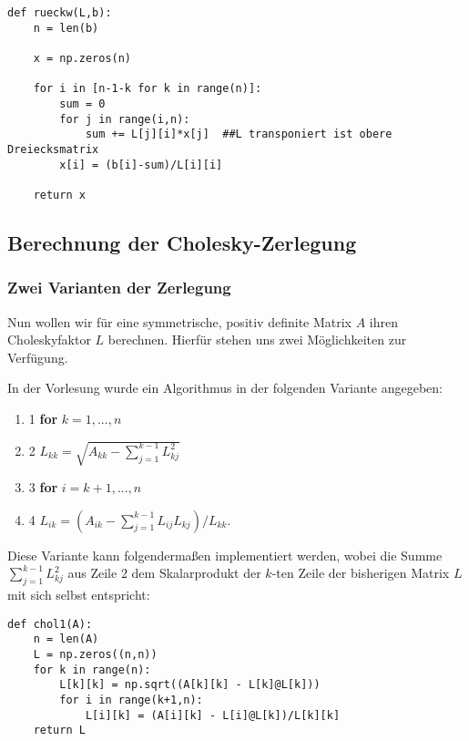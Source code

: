 \lstset{language=Python}
\lstset{frame=lines}
\lstset{basicstyle=\footnotesize}
\begin{lstlisting}
def rueckw(L,b):
    n = len(b)

    x = np.zeros(n)

    for i in [n-1-k for k in range(n)]:
        sum = 0
        for j in range(i,n):
            sum += L[j][i]*x[j]  ##L transponiert ist obere Dreiecksmatrix
        x[i] = (b[i]-sum)/L[i][i]

    return x
\end{lstlisting}

\subsection{Berechnung der Cholesky-Zerlegung}
\subsubsection{Zwei Varianten der Zerlegung}

Nun wollen wir für eine symmetrische, positiv definite Matrix $A$ ihren Choleskyfaktor $L$ berechnen. Hierfür stehen uns zwei Möglichkeiten zur Verfügung.

In der Vorlesung wurde ein Algorithmus in der folgenden Variante angegeben:
\begin{enumerate}
\itemsep0em
\item[] 1 \textbf{for} $k = 1,...,n$
\item[] 2 \qquad $L_{kk} = \sqrt{A_{kk} - \sum_{j=1}^{k-1} L_{kj}^2}$
\item[] 3 \qquad \textbf{for} $i = k+1,...,n$
\item[] 4 \qquad \qquad $L_{ik} = (A_{ik} - \sum_{j=1}^{k-1} L_{ij} L_{kj})/L_{kk}$.

\end{enumerate}


Diese Variante kann folgendermaßen implementiert werden, wobei die Summe $\sum_{j=1}^{k-1}L_{kj}^{2}$ aus Zeile $2$ dem Skalarprodukt der $k$-ten Zeile der bisherigen Matrix $L$ mit sich selbst entspricht:

\lstset{language=Python}
\lstset{frame=lines}
\lstset{basicstyle=\footnotesize}
\begin{lstlisting}
def chol1(A):
    n = len(A)
    L = np.zeros((n,n))
    for k in range(n):
        L[k][k] = np.sqrt((A[k][k] - L[k]@L[k]))
        for i in range(k+1,n):
            L[i][k] = (A[i][k] - L[i]@L[k])/L[k][k]
    return L
\end{lstlisting}

